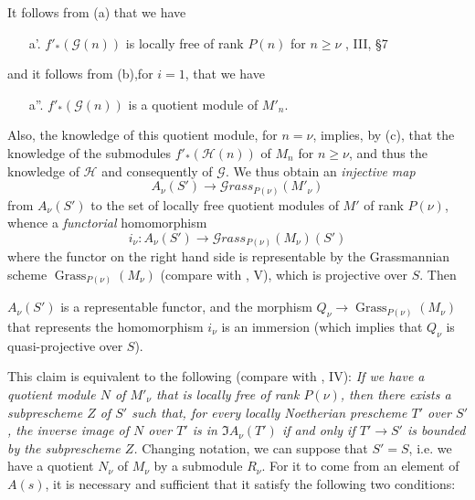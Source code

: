 It follows from (a) that we have

\begin{enumerate}
  \item[a'.] $f'_*(\mathcal{G} (n))$ is locally free of rank $P(n)$ for $n\geqslant\nu$ \cite{GD1960}, III, §7
\end{enumerate}

and it follows from (b),for $i=1$, that we have

\begin{enumerate}
  \item[a''.] $f'_*(\mathcal{G} (n))$ is a quotient module of $M'_n$.
\end{enumerate}

Also, the knowledge of this quotient module, for $n=\nu$, implies, by (c), that the knowledge of the submodules $f'_*(\mathcal{H} (n))$ of $M_n$ for $n\geqslant\nu$, and thus the knowledge of $\mathcal{H}$ and consequently of $\mathcal{G}$.
We thus obtain an \emph{injective map}
\[
  A_\nu(S') \to \mathcal{G}rass_{P(\nu)} (M'_\nu)
\]
from $A_\nu(S')$ to the set of locally free quotient modules of $M'$ of rank $P(\nu)$, whence a \emph{functorial} homomorphism
\[
  i_\nu\colon A_\nu(S') \to \mathcal{G}rass_{P(\nu)} (M_\nu)(S')
\]
where the functor on the right hand side is representable by the Grassmannian scheme $\operatorname{Grass}_{P(\nu)} (M_\nu)$ (compare with \cite{Gro1960a}, V), which is projective over $S$.
Then


\begin{lemma}\label{fga3.iv-3-lemma-3.3}

  $A_\nu(S')$ is a representable functor, and the morphism $Q_\nu\to\operatorname{Grass}_{P(\nu)} (M_\nu)$ that represents the homomorphism $i_\nu$ is an immersion (which implies that $Q_\nu$ is quasi-projective over $S$).
\end{lemma}


This claim is equivalent to the following (compare with \cite{Gro1960a}, IV):
\emph{If we have a quotient module $N$ of $M'_\nu$ that is locally free of rank $P(\nu)$, then there exists a subprescheme $Z$ of $S'$ such that, for every locally Noetherian prescheme $T'$ over $S'$, the inverse image of $N$ over $T'$ is in $\Im A_\nu(T')$ if and only if $T'\to S'$ is bounded by the subprescheme $Z$.}
Changing notation, we can suppose that $S'=S$, i.e. we have a quotient $N_\nu$ of $M_\nu$ by a submodule $R_\nu$.
For it to come from an element of $A(s)$, it is necessary and sufficient that it satisfy the following two conditions:

